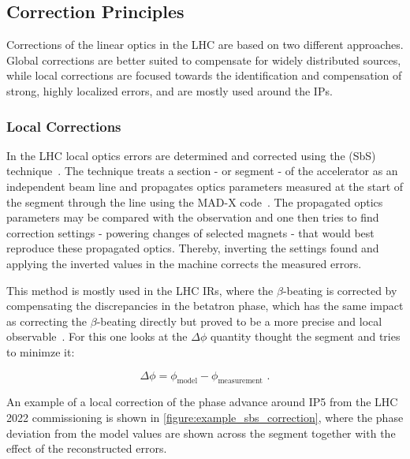 \subsection{Correction Principles}
\label{subsection:correction_principles}

Corrections of the linear optics in the LHC are based on two different approaches.
Global corrections are better suited to compensate for widely distributed sources, while local corrections are focused towards the identification and compensation of strong, highly localized errors, and are mostly used around the IPs.

\subsubsection*{Local Corrections}

In the LHC local optics errors are determined and corrected using the  (SbS) technique~\cite{PRAB:Tomas:CERN_LHC_OMC,PRAB:Tomas:Review_Linear_Optics_Measurements}.
The technique treats a section - or segment - of the accelerator as an independent beam line and propagates optics parameters measured at the start of the segment through the line using the MAD-X code~\cite{CODE:MADX_guide}.
The propagated optics parameters may be compared with the observation and one then tries to find correction settings - powering changes of selected magnets - that would best reproduce these propagated optics.
Thereby, inverting the settings found and applying the inverted values in the machine corrects the measured errors.

This method is mostly used in the LHC IRs, where the \(\beta\)-beating is corrected by compensating the discrepancies in the betatron phase, which has the same impact as correcting the \(\beta\)-beating directly but proved to be a more precise and local observable~\cite{PRAB:Tomas:CERN_LHC_OMC}.
For this one looks at the \(\Delta \phi\) quantity thought the segment and tries to minimze it:

\begin{equation}
  \Delta \phi = \phi_{\mathrm{model}} - \phi_{\mathrm{measurement}} \text{ .}
  \label{equation:sbs_delta_phi}
\end{equation}

An example of a local correction of the phase advance around IP\num{5} from the LHC \num{2022} commissioning is shown in \cref{figure:example_sbs_correction}, where the phase deviation from the model values are shown across the segment together with the effect of the reconstructed errors.

